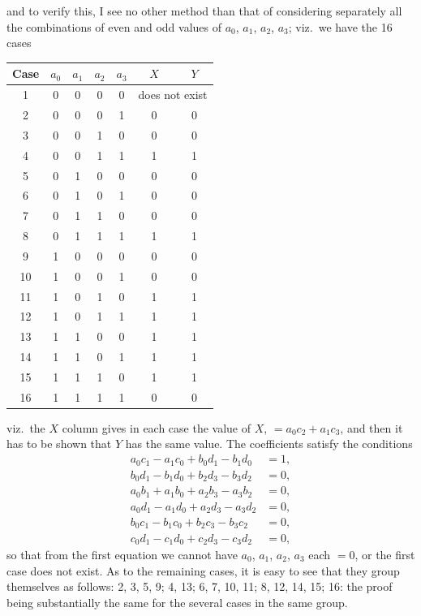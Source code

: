 \documentclass[11pt]{article}
\begin{document}
\medskip
and to verify this, I see no other method than that of considering separately all the combinations of even and odd values of $a_{0}$, $a_{1}$, $a_{2}$, $a_{3}$; viz.\ we have the 16 cases
\begin{center}
\begin{tabular}{|c|cccc|c|c|}
\hline
Case & $a_{0}$ & $a_{1}$ & $a_{2}$ & $a_{3}$ & $X$ & $Y$\\
\hline
1  & 0 & 0 & 0 & 0 & \multicolumn{2}{c|}{does not exist}\\
2  & 0 & 0 & 0 & 1 & 0 & 0\\
3  & 0 & 0 & 1 & 0 & 0 & 0\\
4  & 0 & 0 & 1 & 1 & 1 & 1\\
\hline
5  & 0 & 1 & 0 & 0 & 0 & 0\\
6  & 0 & 1 & 0 & 1 & 0 & 0\\
7  & 0 & 1 & 1 & 0 & 0 & 0\\
8  & 0 & 1 & 1 & 1 & 1 & 1\\
\hline
9  & 1 & 0 & 0 & 0 & 0 & 0\\
10 & 1 & 0 & 0 & 1 & 0 & 0\\
11 & 1 & 0 & 1 & 0 & 1 & 1\\
12 & 1 & 0 & 1 & 1 & 1 & 1\\
\hline
13 & 1 & 1 & 0 & 0 & 1 & 1\\
14 & 1 & 1 & 0 & 1 & 1 & 1\\
15 & 1 & 1 & 1 & 0 & 1 & 1\\
16 & 1 & 1 & 1 & 1 & 0 & 0\\
\hline
\end{tabular}
\end{center}

viz.\ the $X$ column gives in each case the value of $X$, $=a_{0}c_{2}+a_{1}c_{3}$, and then it has to be shown that $Y$ has the same value. The coefficients satisfy the conditions
\begin{align*}
a_{0}c_{1}-a_{1}c_{0}+b_{0}d_{1}-b_{1}d_{0} &= 1,\\
b_{0}d_{1}-b_{1}d_{0}+b_{2}d_{3}-b_{3}d_{2} &= 0,\\
a_{0}b_{1}+a_{1}b_{0}+a_{2}b_{3}-a_{3}b_{2} &= 0,\\
a_{0}d_{1}-a_{1}d_{0}+a_{2}d_{3}-a_{3}d_{2} &= 0,\\
b_{0}c_{1}-b_{1}c_{0}+b_{2}c_{3}-b_{3}c_{2} &= 0,\\
c_{0}d_{1}-c_{1}d_{0}+c_{2}d_{3}-c_{3}d_{2} &= 0,
\end{align*}
so that from the first equation we cannot have $a_{0}$, $a_{1}$, $a_{2}$, $a_{3}$ each $=0$, or the first case does not exist. As to the remaining cases, it is easy to see that they group themselves as follows: 2, 3, 5, 9; 4, 13; 6, 7, 10, 11; 8, 12, 14, 15; 16: the proof being substantially the same for the several cases in the same group.
\end{document}
